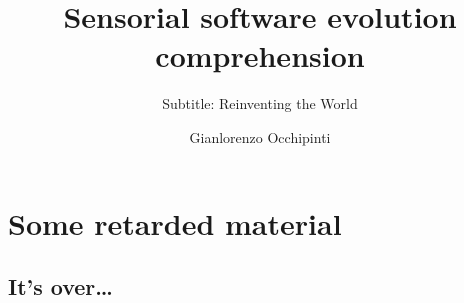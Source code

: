 \documentclass[mscthesis]{usiinfthesis}
\title{Sensorial software evolution comprehension} %
\subtitle{Subtitle: Reinventing the World} %
\author{Gianlorenzo Occhipinti} %
\begin{document}
\maketitle %

\frontmatter %






\tableofcontents 
\listoffigures %
\listoftables %

\mainmatter





\appendix %

\chapter{Some retarded material}
\section{It's over\dots}
\lipsum 

\backmatter


%
%




\end{document}
